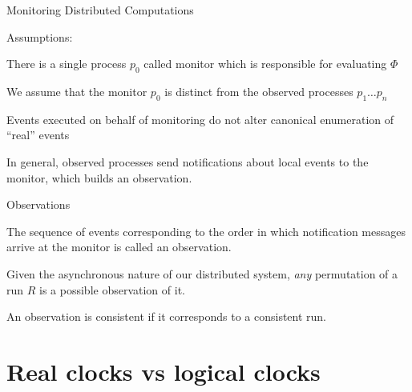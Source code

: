 \begin{frame}{Monitoring Distributed Computations}

\BIL
\item Assumptions: 
  \BI
  \item There is a single process $p_0$ called \alert{monitor} which
    is responsible for evaluating $\Phi$
  \item We assume that the monitor $p_0$ is distinct from the observed
    processes $p_1 \ldots p_n$ 
  \item Events executed on behalf of monitoring do not alter
    canonical enumeration of ``real'' events
  \EI
\item In general, observed processes send notifications about local events
  to the monitor, which builds an \alert{observation}. 
\EIL


\end{frame}

\begin{frame}{Observations}

\begin{definition}[Observation]
The sequence of events corresponding to the order in which notification
messages arrive at the monitor is called an \alert{observation}.
\end{definition}

\bigskip
Given the asynchronous nature of our distributed system, \emph{any}
permutation of a run $R$ is a possible observation of it.

\bigskip
\begin{definition}
An observation is \alert{consistent} if it corresponds to a consistent run.
\end{definition}

\end{frame}

\section{Real clocks vs logical clocks}

% 
% 

